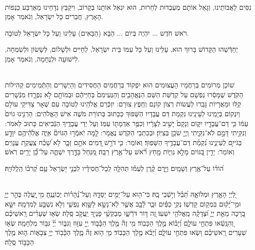 \documentclass[twoside, openany, parskip=half, 11pt]{book}
\begin{document}
\\
 נִסִּים לַאֲבוֹתֵינוּ, וְגָאַל אוֹתָם מֵעַבְדוּת לְחֵרוּת, הוּא יִגְאַל אוֹתָנוּ בְּקָרוֹב, וִיקַבֵּץ נִדָּחֵינוּ מֵאַרְבַּע כַּנְפוֹת הָאָרֶץ, חֲבֵרִים כָּל יִשְׂרָאֵל, וְנֹאמַר אָמֵן.

רֹאשׁ חֹדֶש ... יִהְיֶה בְּיוֹם ... הַבָּא (הַבָּאִים) עָלֵינוּ וְעַל כָּל יִשְׂרָאֵל לְטוֹבָה.

יְחַדְּֿשֵׁהוּ הַקָּדוֹשׁ בָּרוּךְ הוּא, עָלֵינוּ וְעַל כָּל עַמּוֹ בֵּית יִשְׂרָאֵל, לְחַיִּים וּלְשָׁלוֹם, לְשָׂשׂוֹן וּלְשִׂמְחָה, לִישׁוּעָה וּלְנֶחָמָה, וְנֹאמַר אָמֵן.

\sepline

\ashrei

\\
 שׁוֹכֵן מְרוֹמִים בְּרַחֲמָיו הָעֲצוּמִים הוּא יִפְקוֹד בְּרַחֲמִים הַחֲסִידִים וְהַיְשָׁרִים וְהַתְּֿמִימִים קְהִילּוֹת הַקֹּֽדֶשׁ שֶׁמָּסְֿרוּ נַפְשָׁם עַל קְדֻשַּׁת הַשֵּׁם
  הַנֶּאֱהָבִ֤ים וְהַנְּעִימִם֙ בְּחַיֵּיהֶ֔ם וּבְמוֹתָ֖ם לֹ֣א נִפְרָ֑דוּ׃ מִנְּֿשָׁרִים קַֽלּוּ וּמֵאֲרָיוֹת גָּבֵֽרוּ לַעֲשׂוֹת רְצוֹן קוֹנָם וְחֵֽפֶץ צוּרָם: יִזְכְּֿרֵם אֱלֹהֵֽינוּ לְטוֹבָה עִם שְׁאָר צַדִּיקֵי עוֹלָם וְיִנְקוֹם בְּיָמֵֽינוּ לְעֵינֵֽינוּ נִקְמַת דַּם עֲבָדָיו הַשָּׁפוּךְ כַּכָּתוּב בְּתוֹרַת מֹשֶׁה אִישׁ הָאֱלֹהִים:
 הַרְנִ֤ינוּ גוֹיִם֙ עַמּ֔וֹ כִּ֥י דַם־עֲבָדָ֖יו יִקּ֑וֹם וְנָקָם֙ יָשִׁ֣יב לְצָרָ֔יו וְכִפֶּ֥ר אַדְמָת֖וֹ עַמּֽוֹ׃ וְעַל יְדֵי עֲבָדֶֽיךָ הַנְּֿבִיאִים כָּתוּב לֵאמֹר:
 וְנִקֵּ֖יתִי דָּמָ֣ם לֹֽא־נִקֵּ֑יתִי וַֽיְיָ֖ שֹׁכֵ֥ן בְּצִיּֽוֹן׃ וּבְכִתְבֵי הַקֹּֽדֶשׁ נֶאֱמַר:
 לָ֤מָּה יֹֽאמְֿר֣וּ הַגּוֹיִם֘ אַיֵּ֢ה אֱלֹֽהֵ֫יהֶ֥ם יִוָּדַ֣ע בַּגֹּייִ֣ם לְעֵינֵ֑ינוּ נִ֝קְמַ֗ת דַּם־עֲבָדֶ֥יךָ הַשָּׁפֽוּךְ׃ וְאוֹמֵר:
 כִּ֤י דֹרֵ֣שׁ דָּ֭מִים אֹתָ֣ם זָכָ֑ר לֹ֥א שָׁ֝כַ֗ח צַֽעֲקַ֥ת עֲנָוִֽים׃ וְאוֹמֵר:
 יָדִ֣ין בַּ֭גּוֹיִם מָלֵ֣א גְוִיּ֑וֹת מָ֥חַץ רֹ֝֗אשׁ עַל־אֶ֥רֶץ רַבָּֽה׃ מִ֭נַּחַל בַּדֶּ֣רֶךְ יִשְׁתֶּ֑ה עַל־כֵּ֝֗ן יָרִ֥ים רֹֽאשׁ׃






 ה֝וֹד֗וֹ עַל־אֶ֥רֶץ וְשָׁמָֽיִם׃ וַיָּ֤רֶם קֶ֨רֶן לְעַמּ֡וֹ תְּהִלָּ֤ה לְֽכָל־חֲסִידָ֗יו לִבְנֵ֣י יִ֭שְׂרָאֵל עַ֥ם קְ֝רֹב֗וֹ הַֽלֲלוּיָֽהּ׃


\\
לַ֭יְיָ הָאָ֣רֶץ וּמְלוֹאָ֑הּ תֵּ֝בֵ֗ל וְי֣שְֿׁבֵי בָֽהּ׃ 
כִּי־ה֖וּא עַל־יַמִּ֣ים יְסָדָ֑הּ וְעַל־נְ֝הָר֗וֹת יְכֽוֹנֲנֶֽהָ׃ 
מִ֥י ֖יַֽעֲלֶה בְּהַ֣ר יְיָ֑ וּמִ֥י־יָ֝ק֗וּם בִּמְק֥וֹם קָדְשֽׁוֹ׃ 
נְקִ֥י כַפַּ֗יִם וּבַ֢ר לֵ֫בָ֥ב אֲשֶׁ֤ר לֹֽא־נָשָׂ֣א לַשָּׁ֣וְא נַפְשִׁ֑י וְלֹ֖א נִשְׁבַּ֣ע לְמִרְמָֽה׃ 
יִשָּׂ֣א בְ֭רָכָה מֵאֵ֣ת יְיָ֑ וּ֝צְדָקָ֗ה מֵֽאֱלֹהֵ֥י יִשְׁעֽוֹ׃ 
זֶ֭ה דּ֣וֹר דֹּרְֿשָׁ֑ו מְבַקְשֵׁ֥֨י פָנֶי֖ךָ יַֽעֲקֹ֣ב סֶֽלָה׃ 
שְׂא֤וּ שְׁעָרִ֨ים רָֽאשֵׁיכֶ֗ם וְ֭הִנָּֽשְֿׂאוּ פִּתְחֵ֣י עוֹלָ֑ם וְ֝יָב֗וֹא מֶ֣לֶךְ הַכָּבֽוֹד׃ 
מִ֥י זֶה֘ מֶ֤לֶךְ הַכָּ֫ב֥וֹד יְ֖יָ עִזּ֣וּז וְגִבּ֑וֹר יְ֜יָ֗ גִּבּ֥וֹר מִלְחָמָֽה׃ 
שְׂא֤וּ שְׁעָרִים רָֽאשֵׁיכֶ֗ם וּ֭שְׂאוּ פִּתְחֵ֣י עוֹלָ֑ם וְ֝יָבֹ֗א מֶ֣לֶךְ הַכָּבֽוֹד׃ 
מִ֤י ה֣וּא זֶה֘ מֶ֢לֶךְ הַכָּ֫ב֥וֹד יְיָ֥ צְבָא֑וֹת ה֤וּא מֶ֖לֶךְ הַכָּב֣וֹד סֶֽלָה׃
\end{document}
